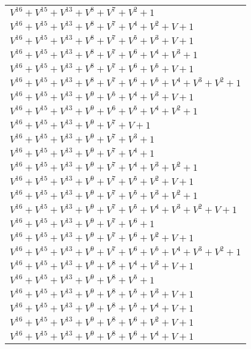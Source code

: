 \documentclass[12pt]{article}
\begin{document}
\begin{adjustwidth}{-4cm}{}
\begin{center}
\begin{longtable}{|l|}
$V^{16}  +V^{15}  +V^{13}  +V^{8}  +V^{7}  +V^{2}  + 1$ \\
$V^{16}  +V^{15}  +V^{13}  +V^{8}  +V^{7}  +V^{4}  +V^{2}  + V + 1$ \\
$V^{16}  +V^{15}  +V^{13}  +V^{8}  +V^{7}  +V^{5}  +V^{3}  + V + 1$ \\
$V^{16}  +V^{15}  +V^{13}  +V^{8}  +V^{7}  +V^{6}  +V^{4}  +V^{3}  + 1$ \\
$V^{16}  +V^{15}  +V^{13}  +V^{8}  +V^{7}  +V^{6}  +V^{5}  + V + 1$ \\
$V^{16}  +V^{15}  +V^{13}  +V^{8}  +V^{7}  +V^{6}  +V^{5}  +V^{4}  +V^{3}  +V^{2}  + 1$ \\
$V^{16}  +V^{15}  +V^{13}  +V^{9}  +V^{5}  +V^{4}  +V^{3}  + V + 1$ \\
$V^{16}  +V^{15}  +V^{13}  +V^{9}  +V^{6}  +V^{5}  +V^{4}  +V^{2}  + 1$ \\
$V^{16}  +V^{15}  +V^{13}  +V^{9}  +V^{7}  + V + 1$ \\
$V^{16}  +V^{15}  +V^{13}  +V^{9}  +V^{7}  +V^{3}  + 1$ \\
$V^{16}  +V^{15}  +V^{13}  +V^{9}  +V^{7}  +V^{4}  + 1$ \\
$V^{16}  +V^{15}  +V^{13}  +V^{9}  +V^{7}  +V^{4}  +V^{3}  +V^{2}  + 1$ \\
$V^{16}  +V^{15}  +V^{13}  +V^{9}  +V^{7}  +V^{5}  +V^{2}  + V + 1$ \\
$V^{16}  +V^{15}  +V^{13}  +V^{9}  +V^{7}  +V^{5}  +V^{3}  +V^{2}  + 1$ \\
$V^{16}  +V^{15}  +V^{13}  +V^{9}  +V^{7}  +V^{5}  +V^{4}  +V^{3}  +V^{2}  + V + 1$ \\
$V^{16}  +V^{15}  +V^{13}  +V^{9}  +V^{7}  +V^{6}  + 1$ \\
$V^{16}  +V^{15}  +V^{13}  +V^{9}  +V^{7}  +V^{6}  +V^{2}  + V + 1$ \\
$V^{16}  +V^{15}  +V^{13}  +V^{9}  +V^{7}  +V^{6}  +V^{5}  +V^{4}  +V^{3}  +V^{2}  + 1$ \\
$V^{16}  +V^{15}  +V^{13}  +V^{9}  +V^{8}  +V^{4}  +V^{3}  + V + 1$ \\
$V^{16}  +V^{15}  +V^{13}  +V^{9}  +V^{8}  +V^{5}  + 1$ \\
$V^{16}  +V^{15}  +V^{13}  +V^{9}  +V^{8}  +V^{5}  +V^{3}  + V + 1$ \\
$V^{16}  +V^{15}  +V^{13}  +V^{9}  +V^{8}  +V^{5}  +V^{4}  + V + 1$ \\
$V^{16}  +V^{15}  +V^{13}  +V^{9}  +V^{8}  +V^{6}  +V^{2}  + V + 1$ \\
$V^{16}  +V^{15}  +V^{13}  +V^{9}  +V^{8}  +V^{6}  +V^{4}  + V + 1$ \\

\end{longtable}
\end{center}
\end{adjustwidth}
\end{document}

